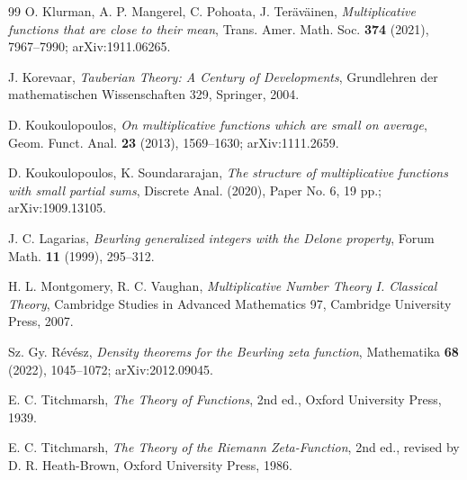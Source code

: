 \documentclass[11pt]{amsart}
\theoremstyle{remark}
\numberwithin{equation}{section}
\begin{document}
\begin{thebibliography}{99}
 O. Klurman, A. P. Mangerel, C. Pohoata, J. Ter\"av\"ainen, \emph{Multiplicative functions that are close to their mean}, Trans. Amer. Math. Soc. \textbf{374} (2021), 7967--7990; arXiv:1911.06265.

 J. Korevaar, \emph{Tauberian Theory: A Century of Developments}, Grundlehren der mathematischen Wissenschaften 329, Springer, 2004.

 D. Koukoulopoulos, \emph{On multiplicative functions which are small on average}, Geom. Funct. Anal. \textbf{23} (2013), 1569--1630; arXiv:1111.2659.

 D. Koukoulopoulos, K. Soundararajan, \emph{The structure of multiplicative functions with small partial sums}, Discrete Anal. (2020), Paper No. 6, 19 pp.; arXiv:1909.13105.

 J. C. Lagarias, \emph{Beurling generalized integers with the Delone property}, Forum Math. \textbf{11} (1999), 295--312.

 H. L. Montgomery, R. C. Vaughan, \emph{Multiplicative Number Theory I. Classical Theory}, Cambridge Studies in Advanced Mathematics 97, Cambridge University Press, 2007.

 Sz. Gy. R\'ev\'esz, \emph{Density theorems for the Beurling zeta function}, Mathematika \textbf{68} (2022), 1045--1072; arXiv:2012.09045.

 E. C. Titchmarsh, \emph{The Theory of Functions}, 2nd ed., Oxford University Press, 1939.

 E. C. Titchmarsh, \emph{The Theory of the Riemann Zeta-Function}, 2nd ed., revised by D. R. Heath-Brown, Oxford University Press, 1986.

\end{thebibliography}
\end{document}

